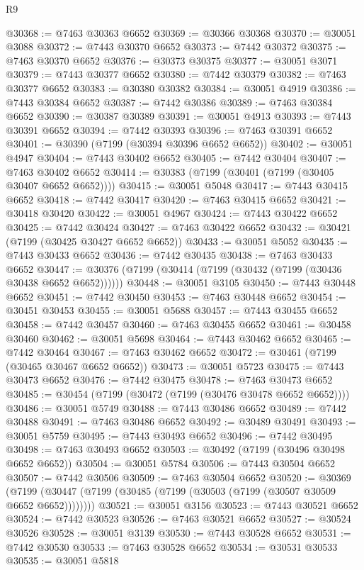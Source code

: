 \begin{lexlean}{R9}
\begin{coremodule}
@30368 := @7463 @30363 @6652
@30369 := @30366 @30368
@30370 := @30051 @3088
@30372 := @7443 @30370 @6652
@30373 := @7442 @30372
@30375 := @7463 @30370 @6652
@30376 := @30373 @30375
@30377 := @30051 @3071
@30379 := @7443 @30377 @6652
@30380 := @7442 @30379
@30382 := @7463 @30377 @6652
@30383 := @30380 @30382
@30384 := @30051 @4919
@30386 := @7443 @30384 @6652
@30387 := @7442 @30386
@30389 := @7463 @30384 @6652
@30390 := @30387 @30389
@30391 := @30051 @4913
@30393 := @7443 @30391 @6652
@30394 := @7442 @30393
@30396 := @7463 @30391 @6652
@30401 := @30390 (@7199 (@30394 @30396 @6652 @6652))
@30402 := @30051 @4947
@30404 := @7443 @30402 @6652
@30405 := @7442 @30404
@30407 := @7463 @30402 @6652
@30414 := @30383 (@7199 (@30401 (@7199 (@30405 @30407 @6652 @6652))))
@30415 := @30051 @5048
@30417 := @7443 @30415 @6652
@30418 := @7442 @30417
@30420 := @7463 @30415 @6652
@30421 := @30418 @30420
@30422 := @30051 @4967
@30424 := @7443 @30422 @6652
@30425 := @7442 @30424
@30427 := @7463 @30422 @6652
@30432 := @30421 (@7199 (@30425 @30427 @6652 @6652))
@30433 := @30051 @5052
@30435 := @7443 @30433 @6652
@30436 := @7442 @30435
@30438 := @7463 @30433 @6652
@30447 := @30376 (@7199 (@30414 (@7199 (@30432 (@7199 (@30436 @30438 @6652 @6652))))))
@30448 := @30051 @3105
@30450 := @7443 @30448 @6652
@30451 := @7442 @30450
@30453 := @7463 @30448 @6652
@30454 := @30451 @30453
@30455 := @30051 @5688
@30457 := @7443 @30455 @6652
@30458 := @7442 @30457
@30460 := @7463 @30455 @6652
@30461 := @30458 @30460
@30462 := @30051 @5698
@30464 := @7443 @30462 @6652
@30465 := @7442 @30464
@30467 := @7463 @30462 @6652
@30472 := @30461 (@7199 (@30465 @30467 @6652 @6652))
@30473 := @30051 @5723
@30475 := @7443 @30473 @6652
@30476 := @7442 @30475
@30478 := @7463 @30473 @6652
@30485 := @30454 (@7199 (@30472 (@7199 (@30476 @30478 @6652 @6652))))
@30486 := @30051 @5749
@30488 := @7443 @30486 @6652
@30489 := @7442 @30488
@30491 := @7463 @30486 @6652
@30492 := @30489 @30491
@30493 := @30051 @5759
@30495 := @7443 @30493 @6652
@30496 := @7442 @30495
@30498 := @7463 @30493 @6652
@30503 := @30492 (@7199 (@30496 @30498 @6652 @6652))
@30504 := @30051 @5784
@30506 := @7443 @30504 @6652
@30507 := @7442 @30506
@30509 := @7463 @30504 @6652
@30520 := @30369
    (@7199 (@30447 (@7199 (@30485 (@7199 (@30503 (@7199 (@30507 @30509 @6652 @6652))))))))
@30521 := @30051 @3156
@30523 := @7443 @30521 @6652
@30524 := @7442 @30523
@30526 := @7463 @30521 @6652
@30527 := @30524 @30526
@30528 := @30051 @3139
@30530 := @7443 @30528 @6652
@30531 := @7442 @30530
@30533 := @7463 @30528 @6652
@30534 := @30531 @30533
@30535 := @30051 @5818

\end{coremodule}
\end{lexlean}
